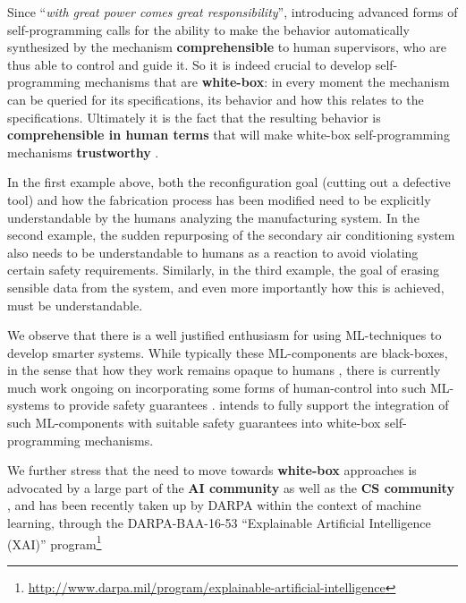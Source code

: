 Since ``\emph{with great power comes great responsibility}'',
introducing advanced forms of self-programming calls for the ability
to make the behavior automatically synthesized by the mechanism
\textbf{comprehensible} to human supervisors, who are thus able to control and guide it.
So it is indeed crucial to develop self-programming mechanisms that are \textbf{white-box}: in every moment the
mechanism can be queried for its specifications, its behavior and how
this relates to the specifications. Ultimately it is the fact that 
the resulting behavior is \textbf{comprehensible in human terms} that will make white-box self-programming mechanisms  \textbf{trustworthy} \cite{CaDa10,Neumann17}.
%


In the first example above, both the reconfiguration goal (cutting out
a defective tool) and how the fabrication process has been modified
need to be explicitly understandable by the humans analyzing the
manufacturing system.
In the second example, the sudden repurposing of the secondary air conditioning
system also needs to be understandable to humans as a reaction to
avoid violating certain safety requirements.
Similarly, in the third example, the goal of erasing sensible data
from the system, and even more importantly how this is achieved, must
be understandable.



We observe that there is a well justified enthusiasm for using ML-techniques
to develop smarter systems.  
%
While typically these ML-components are
black-boxes, in the sense that how they work remains opaque to humans
\cite{MnihKSGAWR13,SilverHMGSDSAPL16},
%
there is currently much work ongoing on incorporating some forms of
human-control into such ML-systems to provide safety guarantees
\cite{ML1,ML2,ML3}. 
%
\project  intends to fully support the integration
of such ML-components with suitable safety guarantees into white-box
self-programming mechanisms.



We further stress that the need to move towards \textbf{white-box}
approaches is advocated by a large part of the \textbf{AI community}
\cite{RussellDT15} as well as the \textbf{CS community} \cite{ACMStatement07}, and has been recently taken up by DARPA within the
context of machine learning, through the DARPA-BAA-16-53 ``Explainable
Artificial Intelligence (XAI)''
program\footnote{\url{http://www.darpa.mil/program/explainable-artificial-intelligence}}

